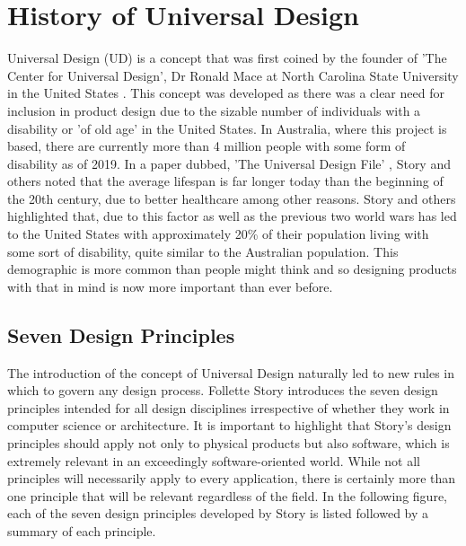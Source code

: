 \section{History of Universal Design}
Universal Design (UD) is a concept that was first coined by the founder of 'The Center for Universal Design', Dr Ronald Mace at North Carolina State University in the United States \cite{ronald}.
This concept was developed as there was a clear need for inclusion in product design due to the sizable number of individuals with a disability or 'of old age' in the United States.
In Australia, where this project is based, there are currently more than 4 million people with some form of disability \cite{ausstats} as of 2019. 
In a paper dubbed, 'The Universal Design File' \cite{universalfile}, Story and others noted that the average lifespan is far longer today than the beginning of the 20th century, due to better healthcare among other reasons.
Story and others highlighted that, due to this factor as well as the previous two world wars has led to the United States with approximately 20\% of their population living with some sort of disability, quite similar to the Australian population.
This demographic is more common than people might think and so designing products with that in mind is now more important than ever before.

\subsection{Seven Design Principles}

The introduction of the concept of Universal Design naturally led to new rules in which to govern any design process. %
Follette Story introduces the seven design principles \cite{sevenprinciples} intended for all design disciplines irrespective of whether they work in computer science or architecture.
It is important to highlight that Story's design principles should apply not only to physical products but also software, which is extremely relevant in an exceedingly software-oriented world.
While not all principles will necessarily apply to every application, there is certainly more than one principle that will be relevant regardless of the field.
In the following figure, each of the seven design principles developed by Story is listed followed by a summary of each principle.

